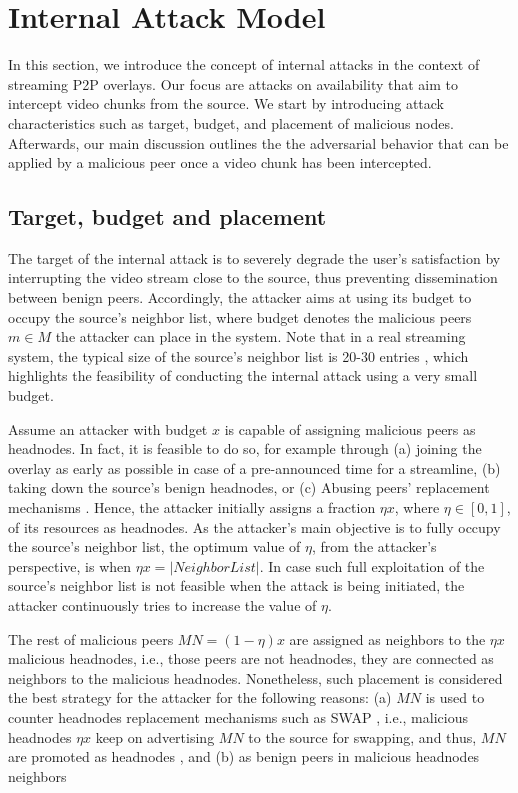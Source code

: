 \section{Internal Attack Model}
\label{sec:Attack}

In this section, we introduce the concept of internal attacks in the context of streaming P2P overlays.
Our focus are attacks on availability that aim to intercept video chunks from the source. 
We start by introducing attack characteristics such as target, budget, and placement of malicious nodes. 
Afterwards, our main discussion outlines the the \drop adversarial behavior that can be applied by a malicious peer once a video chunk has been intercepted. 

\subsection{Target, budget and placement}


The target of the internal attack is to severely degrade the user's satisfaction by interrupting the video stream close to the source, thus preventing dissemination between benign peers.
Accordingly, the attacker aims at using its budget to occupy the source's neighbor list, where budget denotes the malicious peers $m\in M$ the attacker can place in the system.
Note that in a real streaming system, the typical size of the source's neighbor list is 20-30 entries \cite{neighborlist1,neighborlist2}, which highlights the feasibility of conducting the internal attack using a very small budget.

Assume an attacker with budget $x$ is capable of assigning malicious peers as headnodes.
In fact, it is feasible to do so, for example through (a) joining the overlay as early as possible in case of a pre-announced time for a streamline, (b) taking down the source's benign headnodes, or (c) Abusing peers' replacement mechanisms \cite{nguyen2016swap}.
Hence, the attacker initially assigns a fraction $\eta x$, where $\eta\in [0,1]$, of its resources as headnodes.
As the attacker's main objective is to fully occupy the source's neighbor list, the optimum value of $\eta$, from the attacker's perspective, is when $\eta x = |NeighborList|$.
In case such full exploitation of the source's neighbor list is not feasible when the attack is being initiated, the attacker continuously tries to increase the value of $\eta$.  

The rest of malicious peers $MN=(1-\eta) x$ are assigned as neighbors to the $\eta x$ malicious headnodes, i.e., those peers are not headnodes, they are connected as neighbors to the malicious headnodes. 
Nonetheless, such placement is considered the best strategy for the attacker for the following reasons: (a) $MN$ is used to counter headnodes replacement mechanisms such as SWAP \cite{nguyen2016swap}, i.e., malicious headnodes $\eta x$ keep on advertising $MN$ to the source for swapping, and thus, $MN$ are promoted as headnodes
, and (b) as benign peers in malicious headnodes neighbors 


